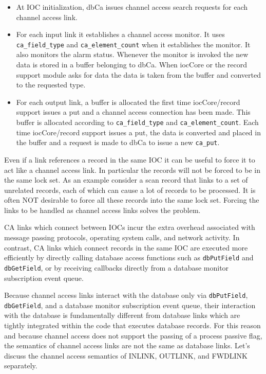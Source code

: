 \begin{itemize}
\item At IOC initialization, dbCa issues channel access search requests for each channel access link.

\item For each input link it establishes a channel access monitor.
It uses \verb|ca_field_type| and \verb|ca_element_count| 
when it establishes the monitor.
It also monitors the alarm status.
Whenever the monitor is invoked the new data is stored in a buffer belonging to dbCa.
When iocCore or the record support module asks for data the data is taken from the buffer and converted to the requested type.

\item For each output link, a buffer is allocated the first time iocCore/record support issues a put and a channel access connection has been made.
This buffer is allocated according to  \verb|ca_field_type| and \verb|ca_element_count|.
Each time iocCore/record support issues a put, the data is converted and placed in the buffer and a request is made to dbCa to issue a new \verb|ca_put|.

\end{itemize}

Even if a link references a record in the same IOC it can be useful to force it to act like a channel access link.
In particular the records will not be forced to be in the same lock set.
As an example consider a scan record that links to a set of unrelated records, each of which can cause a lot of records to be processed.
It is often NOT desirable to force all these records into the same lock set.
Forcing the links to be handled as channel access links solves the problem.

CA links which connect between IOCs incur the extra overhead associated with message passing protocols, operating system calls, and network activity.
In contrast, CA links which connect records in the same IOC are executed more efficiently by directly calling database access functions such as \verb|dbPutField| and \verb|dbGetField|, or by receiving callbacks directly from a database monitor subscription event queue.

Because channel access links interact with the database only via \verb|dbPutField|, \verb|dbGetField|, and a database monitor subscription event queue, their interaction with the database is fundamentally different from database links which are tightly integrated within the code that executes database records.
For this reason and because channel access does not support the passing of a process passive flag, the semantics of channel access links are not the same as database links.
Let's discuss the channel access semantics of INLINK, OUTLINK, and FWDLINK separately.

